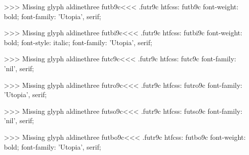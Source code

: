 {>>>
Missing glyph	aldinethree
\<futb9c\><<<
.futr9c
htfcss:  futb9c  font-weight: bold; font-family: 'Utopia', serif;

>>>
Missing glyph	aldinethree
\<futbi9c\><<<
.futr9c
htfcss:  futbi9c  font-weight: bold; font-style: italic; font-family: 'Utopia', serif;

>>>
Missing glyph	aldinethree
\<futc9c\><<<
.futr9c
htfcss:  futc9c  font-family: 'nil', serif;

>>>
Missing glyph	aldinethree
\<futro9c\><<<
.futr9c
htfcss:  futro9c  font-family: 'Utopia', serif;

>>>
Missing glyph	aldinethree
\<futso9c\><<<
.futr9c
htfcss:  futso9c  font-family: 'nil', serif;

>>>
Missing glyph	aldinethree
\<futbo9c\><<<
.futr9c
htfcss:  futbo9c  font-weight: bold; font-family: 'Utopia', serif;

}
